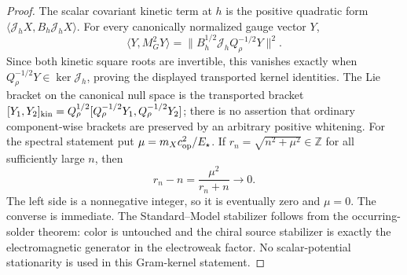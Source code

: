 \documentclass[12pt,a4paper]{article}
\begin{document}
\begin{proof}
The scalar covariant kinetic term at \(h\) is the positive quadratic
form \(\langle\mathcal J_hX,B_h\mathcal J_hX\rangle\).
For every canonically normalized gauge vector \(Y\),
\[
 \langle Y,M_G^2Y\rangle
 =\|B_h^{1/2}\mathcal J_hQ_\rho^{-1/2}Y\|^2.
\]
Since both kinetic square roots are invertible, this vanishes exactly when
\(Q_\rho^{-1/2}Y\in\ker\mathcal J_h\), proving the displayed
transported kernel identities. The Lie bracket on the canonical null space
is the transported bracket
\([Y_1,Y_2]_{\rm kin}=Q_\rho^{1/2}
[Q_\rho^{-1/2}Y_1,Q_\rho^{-1/2}Y_2]\);
there is no assertion that ordinary component-wise brackets are preserved
by an arbitrary positive whitening.  For the spectral statement put
\(\mu=m_Xc_{\rm op}^2/E_\star\).  If
\(r_n=\sqrt{n^2+\mu^2}\in\mathbb Z\) for all sufficiently large \(n\), then
\[
 r_n-n=\frac{\mu^2}{r_n+n}\longrightarrow0.
\]
The left side is a nonnegative integer, so it is eventually zero and
\(\mu=0\).  The converse is immediate.  The Standard--Model stabilizer follows from the occurring-solder theorem: color is untouched and the chiral source stabilizer is exactly the electromagnetic generator in the electroweak factor.  No scalar-potential stationarity is used in this Gram-kernel statement.
\end{proof}
\end{document}
